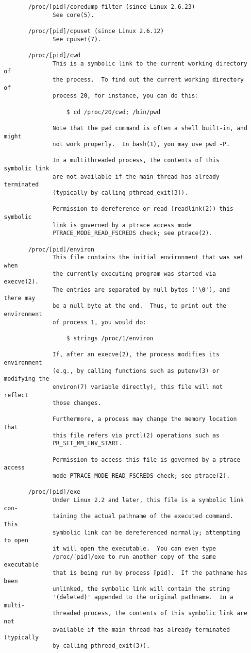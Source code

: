 \documentclass[]{article}
\begin{document}
\begin{verbatim}
       /proc/[pid]/coredump_filter (since Linux 2.6.23)
              See core(5).

       /proc/[pid]/cpuset (since Linux 2.6.12)
              See cpuset(7).

       /proc/[pid]/cwd
              This is a symbolic link to the current working directory of
              the process.  To find out the current working directory of
              process 20, for instance, you can do this:

                  $ cd /proc/20/cwd; /bin/pwd

              Note that the pwd command is often a shell built-in, and might
              not work properly.  In bash(1), you may use pwd -P.

              In a multithreaded process, the contents of this symbolic link
              are not available if the main thread has already terminated
              (typically by calling pthread_exit(3)).

              Permission to dereference or read (readlink(2)) this symbolic
              link is governed by a ptrace access mode
              PTRACE_MODE_READ_FSCREDS check; see ptrace(2).

       /proc/[pid]/environ
              This file contains the initial environment that was set when
              the currently executing program was started via execve(2).
              The entries are separated by null bytes ('\0'), and there may
              be a null byte at the end.  Thus, to print out the environment
              of process 1, you would do:

                  $ strings /proc/1/environ

              If, after an execve(2), the process modifies its environment
              (e.g., by calling functions such as putenv(3) or modifying the
              environ(7) variable directly), this file will not reflect
              those changes.

              Furthermore, a process may change the memory location that
              this file refers via prctl(2) operations such as
              PR_SET_MM_ENV_START.

              Permission to access this file is governed by a ptrace access
              mode PTRACE_MODE_READ_FSCREDS check; see ptrace(2).

       /proc/[pid]/exe
              Under Linux 2.2 and later, this file is a symbolic link con‐
              taining the actual pathname of the executed command.  This
              symbolic link can be dereferenced normally; attempting to open
              it will open the executable.  You can even type
              /proc/[pid]/exe to run another copy of the same executable
              that is being run by process [pid].  If the pathname has been
              unlinked, the symbolic link will contain the string
              '(deleted)' appended to the original pathname.  In a multi‐
              threaded process, the contents of this symbolic link are not
              available if the main thread has already terminated (typically
              by calling pthread_exit(3)).


\end{verbatim}
\end{document}
